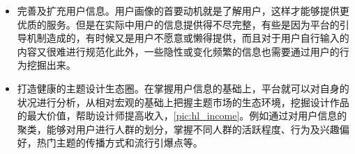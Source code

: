 \begin{itemize}
\item 完善及扩充用户信息。用户画像的首要动机就是了解用户，这样才能够提供更优质的服务。但是在实际中用户的信息提供得不尽完整，有些是因为平台的引导机制造成的，有时候又是用户不愿意或懒得提供，而且对于用户自行输入的内容又很难进行规范化此外，一些隐性或变化频繁的信息也需要通过用户的行为挖掘出来。
\item 打造健康的主题设计生态圈。在掌握用户信息的基础上，平台就可以对自身的状况进行分析，从相对宏观的基础上把握主题市场的生态环境，挖掘设计作品的最大价值，帮助设计师提高收入，\autoref{pic:hl_income}。例如通过对用户信息的聚类，能够对用户进行人群的划分，掌握不同人群的活跃程度、行为及兴趣偏好，热门主题的传播方式和流行引爆点等。
\begin{figure}
\centering
  \label{pic:hl_income}
\end{figure}


\end{itemize}
